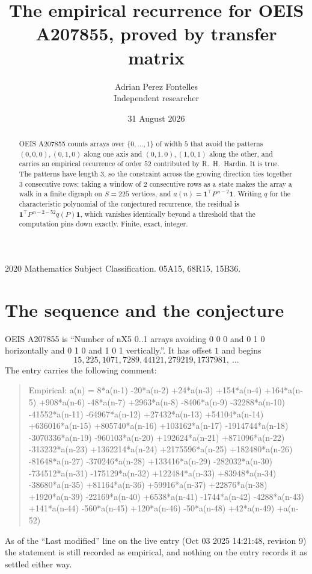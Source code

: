 \documentclass[11pt,a4paper]{article}
\title{The empirical recurrence for OEIS A207855, proved by transfer matrix}
\author{Adrian Perez Fontelles\\ \small Independent researcher}
\date{31 August 2026}
\theoremstyle{plain}
\theoremstyle{definition}
\begin{document}
\maketitle

\begin{abstract}
OEIS A207855 counts arrays over $\{0,\dots,1\}$ of width $5$ that avoid the patterns
$(0,0,0), (0,1,0)$ along one axis and $(0,1,0), (1,0,1)$ along the other, and carries an empirical recurrence of
order $52$ contributed by R.~H.~Hardin. It is true. The patterns have length $3$, so
the constraint across the growing direction ties together $3$ consecutive rows: taking a
window of $2$ consecutive rows as a state makes the array a walk in a finite digraph
on $S=225$ vertices, and $a(n)=\mathbf{1}^{\!\top}P^{\,n-2}\mathbf{1}$. Writing $q$
for the characteristic polynomial of the conjectured recurrence, the residual is
$\mathbf{1}^{\!\top}P^{\,n-2-52}q(P)\mathbf{1}$, which vanishes identically
beyond a threshold that the computation pins down exactly. Finite, exact, integer.
\end{abstract}

\noindent\small 2020 Mathematics Subject Classification. 05A15, 68R15, 15B36.\normalsize

\section{The sequence and the conjecture}

OEIS A207855 is ``Number of nX5 0..1 arrays avoiding 0 0 0 and 0 1 0 horizontally and 0 1 0 and 1 0 1 vertically.''. It has offset
$1$ and begins
\[
15, 225, 1071, 7289, 44121, 279219, 1737981,\ \dots
\]
The entry carries the following comment:
\begin{quote}\small
Empirical: a(n) = 8*a(n-1) -20*a(n-2) +24*a(n-3) +154*a(n-4) +164*a(n-5) +908*a(n-6) -48*a(n-7) +2963*a(n-8) -8406*a(n-9) -32288*a(n-10) -41552*a(n-11) -64967*a(n-12) +27432*a(n-13) +54104*a(n-14) +636016*a(n-15) +805740*a(n-16) +103162*a(n-17) -1914744*a(n-18) -3070336*a(n-19) -960103*a(n-20) +192624*a(n-21) +871096*a(n-22) -313232*a(n-23) +1362214*a(n-24) +2175596*a(n-25) +182480*a(n-26) -81648*a(n-27) -370246*a(n-28) +133416*a(n-29) -282032*a(n-30) -734512*a(n-31) -175129*a(n-32) +122484*a(n-33) +83948*a(n-34) -38680*a(n-35) +81164*a(n-36) +59916*a(n-37) +22876*a(n-38) +1920*a(n-39) -22169*a(n-40) +6538*a(n-41) -1744*a(n-42) -4288*a(n-43) +141*a(n-44) -560*a(n-45) +120*a(n-46) -50*a(n-48) +42*a(n-49) +a(n-52)
\end{quote}
As of the ``Last modified'' line on the live entry (Oct 03 2025 14:21:48, revision
9) the statement is still recorded as empirical, and nothing on the entry
records it as settled either way.
\end{document}
